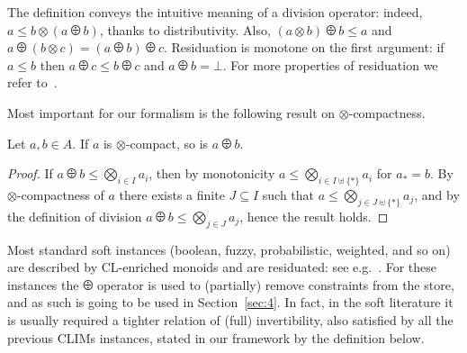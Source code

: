 \documentclass[main.tex]{subfiles}
\begin{document}
The definition conveys the intuitive meaning of a division operator: indeed,
$a \leq b \otimes (a \odiv b)$, thanks to distributivity.
%
Also,
$(a \otimes b) \odiv b \leq a$ and $a \odiv (b \otimes c) = (a \odiv b) \odiv c$.
%
Residuation is monotone on the first argument: if $a \leq b$ then $a \odiv c \leq b \odiv c$
and 
$a \odiv b = \bot$.
%
For more properties of residuation we refer to~\cite[Table~4.1]{resbook}.


Most important for our formalism is the following result on $\otimes$-compactness.

\begin{lemma}
\label{preres}
Let $a, b \in A$. If $a$ is $\otimes$-compact, so is $a \odiv b$.
\end{lemma}

\begin{proof}%
	If $a \odiv b \leq \bigotimes_{i\in I} a_i$, then by monotonicity
	$a \leq \bigotimes_{i \in I \uplus \{*\} } a_i$ for $a_* = b$.
	By $\otimes$-compactness of $a$ there exists a finite $J \subseteq I$
	such that $a \leq \bigotimes_{j \in J \uplus \{*\} } a_j$, and by the definition
	of division $a \odiv b \leq \bigotimes_{j \in J} a_j$, hence the result holds.
\end{proof}

Most standard soft instances (boolean, fuzzy, probabilistic, weighted, and so on)
are described by CL-enriched monoids and are  residuated: see e.g.~\cite{ecai06}.
%
For these instances the $\odiv$ operator is used to (partially) remove constraints from the store,
and as such is going to be used in Section~\ref{sec:4}.
%
In fact, in the soft literature it is usually required a tighter relation of (full) invertibility, 
also satisfied by all the previous CLIMs instances,
stated in our framework by the definition below.
\end{document}
